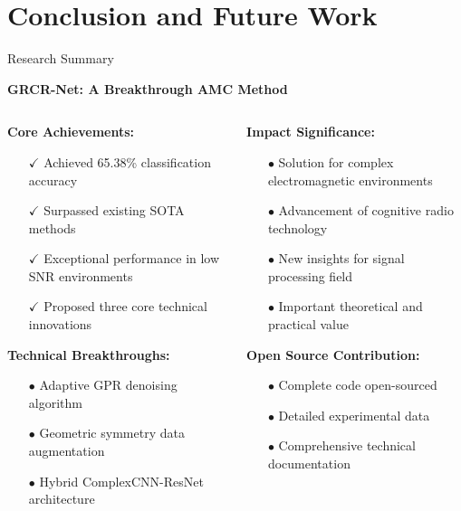 \documentclass[aspectratio=169]{beamer}
\begin{document}
\section{Conclusion and Future Work}

\begin{frame}{Research Summary}
\begin{center}
\textcolor{zjutblue}{\Large \textbf{GRCR-Net: A Breakthrough AMC Method}}
\end{center}

\vspace{0.5cm}
\begin{columns}
\begin{column}{0.5\textwidth}
\textbf{Core Achievements:}
\begin{itemize}
\item[$\checkmark$] Achieved 65.38\% classification accuracy
\item[$\checkmark$] Surpassed existing SOTA methods
\item[$\checkmark$] Exceptional performance in low SNR environments
\item[$\checkmark$] Proposed three core technical innovations
\end{itemize}

\textbf{Technical Breakthroughs:}
\begin{itemize}
\item[$\bullet$] Adaptive GPR denoising algorithm
\item[$\bullet$] Geometric symmetry data augmentation
\item[$\bullet$] Hybrid ComplexCNN-ResNet architecture
\end{itemize}
\end{column}
\begin{column}{0.5\textwidth}
\textbf{Impact Significance:}
\begin{itemize}
\item[$\bullet$] Solution for complex electromagnetic environments
\item[$\bullet$] Advancement of cognitive radio technology
\item[$\bullet$] New insights for signal processing field
\item[$\bullet$] Important theoretical and practical value
\end{itemize}

\textbf{Open Source Contribution:}
\begin{itemize}
\item[$\bullet$] Complete code open-sourced
\item[$\bullet$] Detailed experimental data
\item[$\bullet$] Comprehensive technical documentation
\end{itemize}
\end{column}
\end{columns}
\end{frame}
\end{document}

